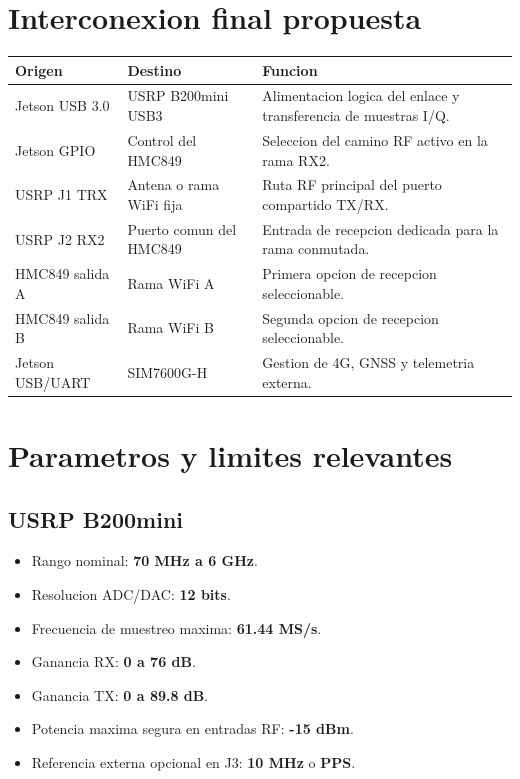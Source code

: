 \documentclass[11pt]{article}
\begin{document}
\section{Interconexion final propuesta}

\begin{table}[h]
    \centering
    \small
    \begin{tabular}{p{}p{}p{}}
        \toprule
        \textbf{Origen} & \textbf{Destino} & \textbf{Funcion} \\
        \midrule
        Jetson USB 3.0 & USRP B200mini USB3 & Alimentacion logica del enlace y transferencia de muestras I/Q. \\
        Jetson GPIO & Control del HMC849 & Seleccion del camino RF activo en la rama RX2. \\
        USRP J1 TRX & Antena o rama WiFi fija & Ruta RF principal del puerto compartido TX/RX. \\
        USRP J2 RX2 & Puerto comun del HMC849 & Entrada de recepcion dedicada para la rama conmutada. \\
        HMC849 salida A & Rama WiFi A & Primera opcion de recepcion seleccionable. \\
        HMC849 salida B & Rama WiFi B & Segunda opcion de recepcion seleccionable. \\
        Jetson USB/UART & SIM7600G-H & Gestion de 4G, GNSS y telemetria externa. \\
        \bottomrule
    \end{tabular}
\end{table}

\section{Parametros y limites relevantes}

\subsection{USRP B200mini}

\begin{itemize}[leftmargin=*]
    \item Rango nominal: \textbf{70 MHz a 6 GHz}.
    \item Resolucion ADC/DAC: \textbf{12 bits}.
    \item Frecuencia de muestreo maxima: \textbf{61.44 MS/s}.
    \item Ganancia RX: \textbf{0 a 76 dB}.
    \item Ganancia TX: \textbf{0 a 89.8 dB}.
    \item Potencia maxima segura en entradas RF: \textbf{-15 dBm}.
    \item Referencia externa opcional en J3: \textbf{10 MHz} o \textbf{PPS}.
\end{itemize}
\end{document}
